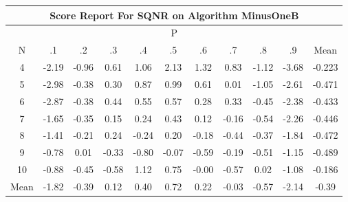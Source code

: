 \documentclass[11pt,a4paper]{report}
\begin{document}
\begin{longtable}{ | c || c | c | c | c | c | c | c | c | c || c |}
\hline
\multicolumn{11}{|c|}{ Score Report For SQNR on Algorithm MinusOneB} \\
\hline
\multicolumn{11}{|c|}{ P } \\
\hline
N & .1 & .2 & .3 & .4 & .5 & .6 & .7 & .8 & .9 & Mean\\
 \hline
 \hline
 \endhead
  4 &  \cellcolor[HTML]{FFC7C7} -2.19 &  \cellcolor[HTML]{FFE7E7} -0.96 &  \cellcolor[HTML]{EFEFFF} 0.61 &  \cellcolor[HTML]{E7E7FF} 1.06 &  \cellcolor[HTML]{C7C7FF} 2.13 &  \cellcolor[HTML]{DFDFFF} 1.32 &  \cellcolor[HTML]{E7E7FF} 0.83 &  \cellcolor[HTML]{FFDFDF} -1.12 &  \cellcolor[HTML]{FF9F9F} -3.68 & -0.223 \\
  5 &  \cellcolor[HTML]{FFB7B7} -2.98 &  \cellcolor[HTML]{FFF7F7} -0.38 &  \cellcolor[HTML]{F7F7FF} 0.30 &  \cellcolor[HTML]{E7E7FF} 0.87 &  \cellcolor[HTML]{E7E7FF} 0.99 &  \cellcolor[HTML]{EFEFFF} 0.61 &  \cellcolor[HTML]{FFFFFF} 0.01 &  \cellcolor[HTML]{FFE7E7} -1.05 &  \cellcolor[HTML]{FFBFBF} -2.61 & -0.471 \\
  6 &  \cellcolor[HTML]{FFB7B7} -2.87 &  \cellcolor[HTML]{FFF7F7} -0.38 &  \cellcolor[HTML]{F7F7FF} 0.44 &  \cellcolor[HTML]{EFEFFF} 0.55 &  \cellcolor[HTML]{EFEFFF} 0.57 &  \cellcolor[HTML]{F7F7FF} 0.28 &  \cellcolor[HTML]{F7F7FF} 0.33 &  \cellcolor[HTML]{FFF7F7} -0.45 &  \cellcolor[HTML]{FFC7C7} -2.38 & -0.433 \\
  7 &  \cellcolor[HTML]{FFD7D7} -1.65 &  \cellcolor[HTML]{FFF7F7} -0.35 &  \cellcolor[HTML]{FFFFFF} 0.15 &  \cellcolor[HTML]{F7F7FF} 0.24 &  \cellcolor[HTML]{F7F7FF} 0.43 &  \cellcolor[HTML]{FFFFFF} 0.12 &  \cellcolor[HTML]{FFFFFF} -0.16 &  \cellcolor[HTML]{FFEFEF} -0.54 &  \cellcolor[HTML]{FFC7C7} -2.26 & -0.446 \\
  8 &  \cellcolor[HTML]{FFDFDF} -1.41 &  \cellcolor[HTML]{FFF7F7} -0.21 &  \cellcolor[HTML]{F7F7FF} 0.24 &  \cellcolor[HTML]{FFF7F7} -0.24 &  \cellcolor[HTML]{F7F7FF} 0.20 &  \cellcolor[HTML]{FFF7F7} -0.18 &  \cellcolor[HTML]{FFF7F7} -0.44 &  \cellcolor[HTML]{FFF7F7} -0.37 &  \cellcolor[HTML]{FFCFCF} -1.84 & -0.472 \\
  9 &  \cellcolor[HTML]{FFEFEF} -0.78 &  \cellcolor[HTML]{FFFFFF} 0.01 &  \cellcolor[HTML]{FFF7F7} -0.33 &  \cellcolor[HTML]{FFE7E7} -0.80 &  \cellcolor[HTML]{FFFFFF} -0.07 &  \cellcolor[HTML]{FFEFEF} -0.59 &  \cellcolor[HTML]{FFF7F7} -0.19 &  \cellcolor[HTML]{FFEFEF} -0.51 &  \cellcolor[HTML]{FFDFDF} -1.15 & -0.489 \\
  10 &  \cellcolor[HTML]{FFE7E7} -0.88 &  \cellcolor[HTML]{FFF7F7} -0.45 &  \cellcolor[HTML]{FFEFEF} -0.58 &  \cellcolor[HTML]{DFDFFF} 1.12 &  \cellcolor[HTML]{EFEFFF} 0.75 &  \cellcolor[HTML]{FFFFFF} -0.00 &  \cellcolor[HTML]{FFEFEF} -0.57 &  \cellcolor[HTML]{FFFFFF} 0.02 &  \cellcolor[HTML]{FFE7E7} -1.08 & -0.186 \\
 \hline
 \hline
Mean &  \cellcolor[HTML]{FFCFCF} -1.82 &  \cellcolor[HTML]{FFF7F7} -0.39 &  \cellcolor[HTML]{FFFFFF} 0.12 &  \cellcolor[HTML]{F7F7FF} 0.40 &  \cellcolor[HTML]{EFEFFF} 0.72 &  \cellcolor[HTML]{F7F7FF} 0.22 &  \cellcolor[HTML]{FFFFFF} -0.03 &  \cellcolor[HTML]{FFEFEF} -0.57 &  \cellcolor[HTML]{FFC7C7} -2.14 &  \cellcolor[HTML]{FFF7F7} -0.39
\end{longtable}
\end{document}
